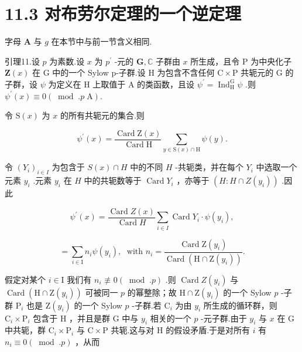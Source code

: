 \documentclass[10pt]{article}
\begin{document}
\section*{11.3 对布劳尔定理的一个逆定理}

字母 \(\mathbf{A}\) 与 \(g\) 在本节中与前一节含义相同.

引理11.设 \(p\) 为素数.设 \(x\) 为 \({p}^{\prime }\) -元的 \(\mathbf{G},\mathbb{C}\) 子群由 \(x\) 所生成，且令 \(\mathrm{P}\) 为中央化子 \(\mathbf{Z}\left( x\right)\) 在 \(\mathrm{G}\) 中的一个 Sylow p-子群.设 \(\mathrm{H}\) 为包含不含任何 \(\mathrm{C} \times  \mathrm{P}\) 共轭元的 \(\mathrm{G}\) 的子群，设 \(\psi\) 为定义在 \(\mathrm{H}\) 上取值于 \(\mathrm{A}\) 的类函数，且设 \({\psi }^{\prime } = {\operatorname{Ind}}_{\mathrm{H}}^{\mathrm{G}}\psi\) .则 \({\psi }^{\prime }\left( x\right)  \equiv  0\left( {{\;\operatorname{mod}\;.}p\mathrm{\;A}}\right) .\)

令 \(\mathrm{S}\left( x\right)\) 为 \(x\) 的所有共轭元的集合.则

\[
{\psi }^{\prime }\left( x\right)  = \frac{\operatorname{Card}\mathrm{Z}\left( x\right) }{\operatorname{Card}\mathrm{H}}\mathop{\sum }\limits_{{y \in  \mathrm{S}\left( x\right)  \cap  \mathrm{H}}}\psi \left( y\right) .
\]

令 \({\left( {Y}_{i}\right) }_{i \in  I}\) 为包含于 \(S\left( x\right)  \cap  H\) 中的不同 \(H\) -共轭类，并在每个 \({Y}_{i}\) 中选取一个元素 \({y}_{i}\) .元素 \({y}_{i}\) 在 \(H\) 中的共轭数等于 \(\operatorname{Card}{Y}_{i}\) ，亦等于 \(\left( {H : H \cap  Z\left( {y}_{i}\right) }\right)\) .因此

\[
{\psi }^{\prime }\left( x\right)  = \frac{\operatorname{Card}Z\left( x\right) }{\operatorname{Card}H}\mathop{\sum }\limits_{{i \in  I}}\operatorname{Card}{Y}_{i} \cdot  \psi \left( {y}_{i}\right) ,
\]

\[
= \mathop{\sum }\limits_{{i \in  \mathrm{I}}}{n}_{i}\psi \left( {y}_{i}\right) ,\;\text{ with }{n}_{i} = \frac{\operatorname{Card}\mathrm{Z}\left( {y}_{i}\right) }{\operatorname{Card}\left( {\mathrm{H} \cap  \mathrm{Z}\left( {y}_{i}\right) }\right) }.
\]

假定对某个 \(i \in  \mathrm{I}\) 我们有 \({n}_{i} \text{ ≢ } 0\left( {\;\operatorname{mod}\;.p}\right)\) .则 \(\operatorname{Card}Z\left( {y}_{i}\right)\) 与 \(\operatorname{Card}\left( {\mathrm{H} \cap  \mathrm{Z}\left( {y}_{i}\right) }\right)\) 可被同一 \(p\) 的幂整除；故 \(\mathrm{H} \cap  \mathrm{Z}\left( {y}_{i}\right)\) 的一个 Sylow \(p\) -子群 \({\mathrm{P}}_{i}\) 也是 \(\mathrm{Z}\left( {y}_{i}\right)\) 的一个 Sylow \(p\) -子群.若 \({\mathrm{C}}_{i}\) 为由 \({y}_{i}\) 所生成的循环群，则 \({\mathrm{C}}_{i} \times  {\mathrm{P}}_{i}\) 包含于 \(\mathrm{H}\) ，并且是群 G 中与 \({y}_{i}\) 相关的一个 \(p\) -元子群.由于 \({y}_{i}\) 与 \(x\) 在 \(\mathrm{G}\) 中共轭，群 \({\mathrm{C}}_{i} \times  {\mathrm{P}}_{i}\) 与 \(\mathrm{C} \times  \mathrm{P}\) 共轭.这与对 \(\mathrm{H}\) 的假设矛盾.于是对所有 \(i\) 有 \({n}_{i} \equiv  0\left( {\;\operatorname{mod}\;.p}\right)\) ，从而
\end{document}
